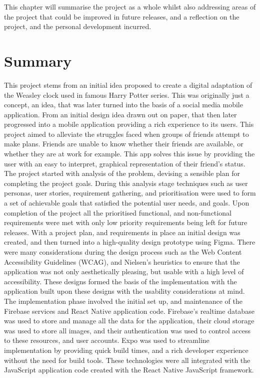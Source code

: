 This chapter will summarise the project as a whole whilst also addressing areas of the project that could be improved in future releases, and a reflection on the project, and the personal development incurred.

\section{Summary}
This project stems from an initial idea proposed to create a digital adaptation of the Weasley clock used in famous Harry Potter series. This was originally just a concept, an idea, that was later turned into the basis of a social media mobile application. From an initial design idea drawn out on paper, that then later progressed into a mobile application providing a rich experience to its users. This project aimed to alleviate the struggles faced when groups of friends attempt to make plans. Friends are unable to know whether their friends are available, or whether they are at work for example. This app solves this issue by providing the user with an easy to interpret, graphical representation of their friend's status.\newline\newline
The project started with analysis of the problem, devising a sensible plan for completing the project goals. During this analysis stage techniques such as user personas, user stories, requirement gathering, and prioritisation were used to form a set of achievable goals that satisfied the potential user needs, and goals. Upon completion of the project all the prioritised functional, and non-functional requirements were met with only low priority requirements being left for future releases. \newline\newline  
With a project plan, and requirements in place an initial design was created, and then turned into a high-quality design prototype using Figma. There were many considerations during the design process such as the Web Content Accessibility Guidelines (WCAG), and Nielsen's heuristics to ensure that the application was not only aesthetically pleasing, but usable with a high level of accessibility.\newline\newline
These designs formed the basis of the implementation with the application built upon these designs with the usability considerations at mind. The implementation phase involved the initial set up, and maintenance of the Firebase services and React Native application code. Firebase's realtime database was used to store and manage all the data for the application, their cloud storage was used to store all images, and their authentication was used to control access to these resources, and user accounts. Expo was used to streamline implementation by providing quick build times, and a rich developer experience without the need for build tools. These technologies were all integrated with the JavaScript application code created with the React Native JavaScript framework. \newline\newline
